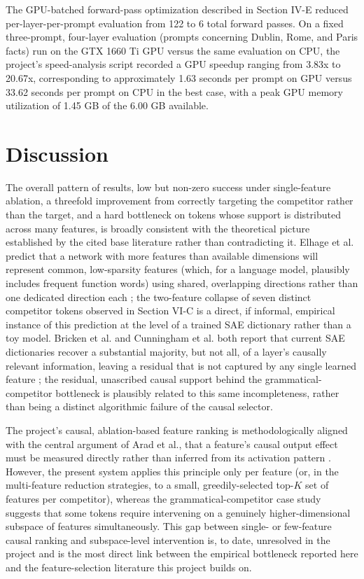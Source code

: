 \documentclass[conference]{IEEEtran}
\begin{document}
The GPU-batched forward-pass optimization described in Section IV-E reduced per-layer-per-prompt evaluation from 122 to 6 total forward passes. On a fixed three-prompt, four-layer evaluation (prompts concerning Dublin, Rome, and Paris facts) run on the GTX 1660 Ti GPU versus the same evaluation on CPU, the project's speed-analysis script recorded a GPU speedup ranging from 3.83x to 20.67x, corresponding to approximately 1.63 seconds per prompt on GPU versus 33.62 seconds per prompt on CPU in the best case, with a peak GPU memory utilization of 1.45 GB of the 6.00 GB available.

\section{Discussion}

The overall pattern of results, low but non-zero success under single-feature ablation, a threefold improvement from correctly targeting the competitor rather than the target, and a hard bottleneck on tokens whose support is distributed across many features, is broadly consistent with the theoretical picture established by the cited base literature rather than contradicting it. Elhage et al. predict that a network with more features than available dimensions will represent common, low-sparsity features (which, for a language model, plausibly includes frequent function words) using shared, overlapping directions rather than one dedicated direction each \cite{elhage2022superposition}; the two-feature collapse of seven distinct competitor tokens observed in Section VI-C is a direct, if informal, empirical instance of this prediction at the level of a trained SAE dictionary rather than a toy model. Bricken et al. and Cunningham et al. both report that current SAE dictionaries recover a substantial majority, but not all, of a layer's causally relevant information, leaving a residual that is not captured by any single learned feature \cite{cunningham2023sparse, bricken2023towards}; the residual, unascribed causal support behind the grammatical-competitor bottleneck is plausibly related to this same incompleteness, rather than being a distinct algorithmic failure of the causal selector.

The project's causal, ablation-based feature ranking is methodologically aligned with the central argument of Arad et al., that a feature's causal output effect must be measured directly rather than inferred from its activation pattern \cite{arad2025steering}. However, the present system applies this principle only per feature (or, in the multi-feature reduction strategies, to a small, greedily-selected top-$K$ set of features per competitor), whereas the grammatical-competitor case study suggests that some tokens require intervening on a genuinely higher-dimensional subspace of features simultaneously. This gap between single- or few-feature causal ranking and subspace-level intervention is, to date, unresolved in the project and is the most direct link between the empirical bottleneck reported here and the feature-selection literature this project builds on.
\end{document}
